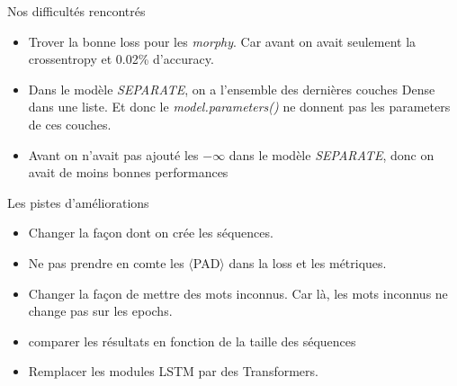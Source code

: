 \documentclass[11pt]{beamer}
\begin{document}
\begin{frame}{Nos difficultés rencontrés}
    \begin{itemize}
        \item Trover la bonne loss pour les \textit{morphy}. Car avant on avait seulement 
            la crossentropy et 0.02\% d'accuracy.
        \item Dans le modèle \textit{SEPARATE}, on a l'ensemble des dernières couches 
            Dense dans une liste. Et donc le \textit{model.parameters()} ne donnent pas les 
            parameters de ces couches.
        \item Avant on n'avait pas ajouté les $-\infty$ dans le modèle \textit{SEPARATE},
            donc on avait de moins bonnes performances
    \end{itemize}
\end{frame}

\begin{frame}{Les pistes d'améliorations}
    \begin{itemize}
        \item Changer la façon dont on crée les séquences.
        \item Ne pas prendre en comte les $\langle$PAD$\rangle$ dans la loss et les métriques.
        \item Changer la façon de mettre des mots inconnus. Car là, les mots inconnus 
            ne change pas sur les epochs.
        \item comparer les résultats en fonction de la taille des séquences
        \item Remplacer les modules LSTM par des Transformers.
    \end{itemize}
\end{frame}
\end{document}
